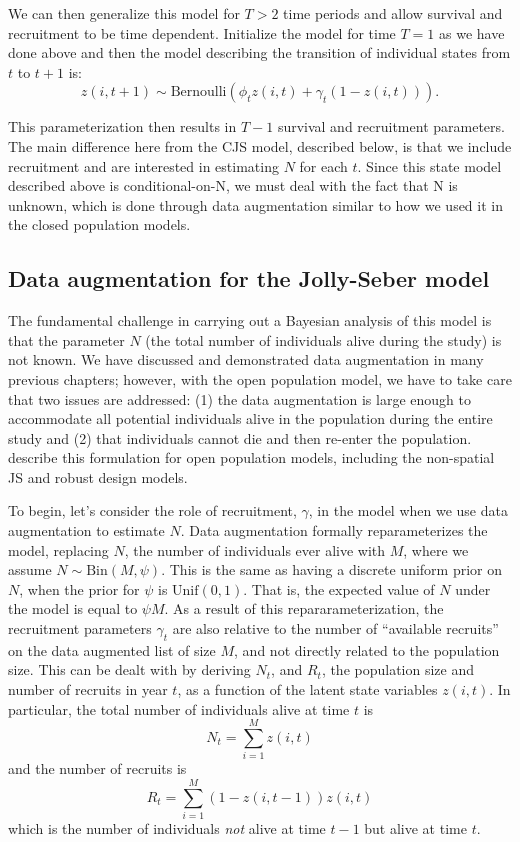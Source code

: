 We can then generalize this model for $T>2$ time periods and allow survival and
recruitment to be time dependent.  Initialize the
model for time $T=1$ as we have done above
and then the model describing the transition of individual states from
$t$ to $t+1$ is:
\[
 z(i,t+1) \sim \mbox{Bernoulli}( \phi_t z(i,t)  + \gamma_t (1-z(i,t)) ).
\]

This parameterization then results in $T-1$ survival and recruitment
parameters.  The main difference here from the CJS model, described below,
 is that we include recruitment and are interested in estimating $N$ for each $t$.
Since this state model described above is conditional-on-N, we must
deal with the fact that N is unknown, which is done through data
augmentation similar to how we used it in the closed population
models.


\subsection{Data augmentation for the Jolly-Seber model}

The fundamental challenge in carrying out a
Bayesian analysis of this model
is that the parameter $N$ (the total number of individuals alive
during the study) 
is not known.  We have discussed and
demonstrated data augmentation in many previous chapters; however,
with the open population model, we have to take care that two issues
are addressed: (1) the data augmentation is large enough to accommodate
all potential individuals alive in the population during the entire
study and (2) that individuals cannot die and then re-enter the
population.  \citep{royle_dorazio:2008} describe this formulation for 
open population models, including the non-spatial JS and robust
design models. 

To begin, let's consider the role of recruitment, $\gamma$, in the
model when we use data augmentation to estimate $N$. 
Data augmentation formally reparameterizes the model, replacing $N$,
the number of individuals ever alive with $M$, where we
assume $N \sim \mbox {Bin}(M, \psi)$.  This is the same as having
a discrete uniform prior on $N$, when the prior for $\psi$ is $\mbox{Unif}(0,1)$.
That is, the expected value of $N$ under the model is equal to
$\psi M$.  As a result of this repararameterization, the recruitment
parameters $\gamma_{t}$ are also relative to the number of ``available
recruits'' on the data augmented list of size $M$, and not directly
related to the population size.  This can be dealt with 
by deriving
$N_t$, and $R_{t}$, the population size and number of recruits in year
$t$, as a function of the latent state variables $z(i,t)$.  In
particular, the total number of individuals alive at time $t$ is
\[
N_{t} = \sum_{i=1}^{M} z(i,t)
\]
and the number of recruits is
\[
R_{t} = \sum_{i=1}^{M} (1-z(i,t-1))z(i,t)
\]
which is the number of individuals {\it not} alive at time $t-1$ but
alive at time $t$.


